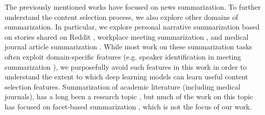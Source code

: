 The previously mentioned works have
focused on news summarization. To further
understand the content selection process, we also explore other domains 
of summarization. In particular, we explore 
personal narrative summarization based on stories shared
on Reddit \cite{ouyang2017crowd}, workplace meeting summarization
\cite{carletta2005ami}, and medical journal article summarization 
\cite{mishra2014text}. While most work on these summarization tasks
 often exploit domain-specific features (e.g. speaker identification in meeting summarization \cite{galley2006skip,gillick2009global}),
we purposefully avoid such features in this work in order to understand 
the extent to which deep learning models can learn useful content 
selection features.
Summarization of academic literature (including medical journals), has a long 
been a research topic
\cite{kupiec1995trainable,elhadad2005customization}, but much of the work on this topic has
focused on facet-based summarization \cite{jaidka2017insights}, which is not the focus of our work.












%
%
%
%



